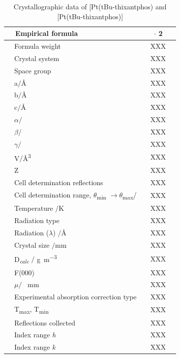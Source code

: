 \begin{table}[htp]
\caption[Crystallographic data of [Pt(tBu-thixantphos)\ce{O2}{]} and [Pt(tBu-thixantphos){]}]{Crystallographic data of [Pt(tBu-thixantphos)\ce{O2}{]} and [Pt(tBu-thixantphos){]}} 
\label{table:crystal14electron:data}
\begin{center}
\begin{tabular}{l l}
	\toprule{}
	~~\bfseries{Empirical formula}~~&~~\ce{C30H46O3P2PtS} $\cdot{}$ 2\ce{C6H6}\\
	\midrule{}	
	~~Formula weight~~		&~~XXX~~	\\
	~~Crystal system~~		&~~XXX~~	\\
	~~Space group~~		&~~XXX~~	\\
	~~a$/$\si{\angstrom}~~	&~~XXX~~	\\
	~~b$/$\si{\angstrom}~~	&~~XXX~~	\\
	~~c$/$\si{\angstrom}~~	&~~XXX~~	\\
	~~$\alpha/$\degrees~~	&~~XXX~~	\\
	~~$\beta/$\degrees~~	&~~XXX~~	\\
	~~$\gamma/$\degrees~~	&~~XXX~~	\\
	~~V$/$\si{\angstrom\cubed}&~~XXX~~	\\
	~~Z					&~~XXX~~	\\
	~~Cell determination reflections &~~XXX~~	\\
	~~Cell determination range, $\theta{}$\textsubscript{min} $\longrightarrow \theta{}$\textsubscript{max}/\degrees &~~XXX~~	\\
	~~Temperature $/$\si{\kelvin}	&~~XXX~~	\\
	~~Radiation type			&~~XXX~~	\\
	~~Radiation ($\lambda$) $/$\si{\angstrom}	&~~XXX~~	\\
	~~Crystal size $/$\si{\milli\metre}			&~~XXX~~	\\
	~~D\textsubscript{\emph{calc}} $/$ \si{\gram\per\metre\cubed}	&~~XXX~~	\\
	~~F(000)				&~~XXX~~	\\
	~~$\mu /$	\si{\per\milli\metre}		&~~XXX~~	\\
	~~Experimental absorption correction type	&~~XXX~~	\\
	~~T\textsubscript{max}, T\textsubscript{min}	&~~XXX~~	\\
	~~Reflections collected					&~~XXX~~	\\
	~~Index range \emph{h}		&~~XXX~~	\\
	~~Index range \emph{k}		&~~XXX~~	\\

\end{tabular}
\end{center}
\end{table}
